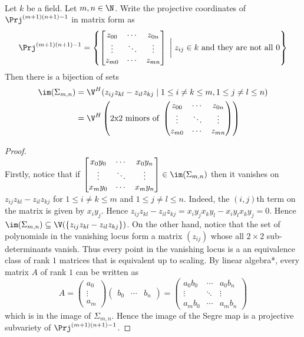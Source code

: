\documentclass[a4paper]{article}
\begin{document}
\begin{prp}{}{}\\
Let $k$ be a field. Let $m,n\in\N$. Write the projective coordinates of $\Prj^{(m+1)(n+1)-1}$ in matrix form as $$\Prj^{(m+1)(n+1)-1}=\left\{\begin{bmatrix}
z_{00} & \cdots & z_{0n}\\
\vdots & \ddots & \vdots\\
z_{m0} & \cdots & z_{mn}
\end{bmatrix}\;\bigg{|}\;z_{ij}\in k\text{ and they are not all }0\right\}$$ Then there is a bijection of sets 
\begin{align*}
\im(\Sigma_{m,n})&=\V^H(z_{ij}z_{kl}-z_{il}z_{kj}\;|\;1\leq i\neq k\leq m,1\leq j\neq l\leq n)\\
&=\V^H\left(\text{2x2 minors of }\begin{pmatrix}
z_{00} & \cdots & z_{0n}\\
\vdots & \ddots & \vdots\\
z_{m0} & \cdots & z_{mn}
\end{pmatrix}\right)
\end{align*}
\begin{proof}\\
Firstly, notice that if $\begin{bmatrix}
x_0y_0 & \cdots & x_0y_n\\
\vdots & \ddots & \vdots\\
x_my_0 & \cdots & x_my_n
\end{bmatrix}\in\im(\Sigma_{m,n})$ then it vanishes on $z_{ij}z_{kl}-z_{il}z_{kj}$ for $1\leq i\neq k\leq m$ and $1\leq j\neq l\leq n$. Indeed, the $(i,j)$th term on the matrix is given by $x_iy_j$. Hence $z_{ij}z_{kl}-z_{il}z_{kj}=x_iy_jx_ky_l-x_iy_lx_ky_j=0$. Hence $\im(\Sigma_{m,n})\subseteq\V(\{z_{ij}z_{kl}-z_{il}z_{kj}\})$. On the other hand, notice that the set of polynomials in the vanishing locus form a matrix $(z_{ij})$ whose all $2\times 2$ sub-determinants vanish. Thus every point in the vanishing locus is a an equivalence class of rank $1$ matrices that is equivalent up to scaling. By linear algebra*, every matrix $A$ of rank $1$ can be written as $$A=\begin{pmatrix}
a_0 \\ \vdots \\ a_m
\end{pmatrix}\begin{pmatrix}
b_0 & \cdots & b_n
\end{pmatrix}=\begin{pmatrix}
a_0b_0 & \cdots & a_0b_n\\
\vdots & \ddots & \vdots\\
a_mb_0 & \cdots & a_mb_n
\end{pmatrix}$$ which is in the image of $\Sigma_{m,n}$. Hence the image of the Segre map is a projective subvariety of $\Prj^{(m+1)(n+1)-1}$. 
\end{proof}
\end{prp}
\end{document}
